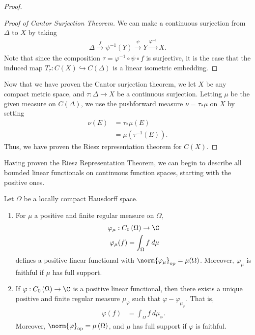 \documentclass[10pt]{mypackage}
\begin{document}
\begin{proof}
\begin{proof}[Proof of Cantor Surjection Theorem]
    We can make a continuous surjection from $\Delta$ to $X$ by taking
    \begin{align*}
      \Delta\xrightarrow{f}\psi^{-1}(Y)\xrightarrow{\psi} Y\xrightarrow{\varphi^{-1}}X.
    \end{align*}
    Note that since the composition $\tau = \varphi^{-1}\circ \psi \circ f$ is surjective, it is the case that the induced map $T_{\tau}: C\left(X\right)\hookrightarrow C\left(\Delta\right)$ is a linear isometric embedding.
  \end{proof}
  Now that we have proven the Cantor surjection theorem, we let $X$ be any compact metric space, and $\tau: \Delta \rightarrow X$ be a continuous surjection. Letting $\mu$ be the given measure on $C(\Delta)$, we use the pushforward measure $\nu = \tau_{\ast}\mu$ on $X$ by setting
  \begin{align*}
    \nu(E) &= \tau_{\ast}\mu\left(E\right)\\
           &= \mu\left(\tau^{-1}\left(E\right)\right).
  \end{align*}
  Thus, we have proven the Riesz representation theorem for $C(X)$.
\end{proof}
Having proven the Riesz Representation Theorem, we can begin to describe all bounded linear functionals on continuous function spaces, starting with the positive ones.
\begin{proposition}
  Let $\Omega$ be a locally compact Hausdorff space.
  \begin{enumerate}[(1)]
    \item For $\mu$ a positive and finite regular measure on $\Omega$,
      \begin{align*}
        \varphi_{\mu}: C_0\left(\Omega\right)\rightarrow \C\\
        \varphi_{\mu}(f) = \int_{\Omega}f\:d\mu
      \end{align*}
      defines a positive linear functional with $\norm{\varphi_{\mu}}_{\text{op}} = \mu\!\left(\Omega\right)$. Moreover, $\varphi_{\mu}$ is faithful if $\mu$ has full support.
    \item If $\varphi: C_0\left(\Omega\right)\rightarrow \C$ is a positive linear functional, then there exists a unique positive and finite regular measure $\mu_{\varphi}$ such that $\varphi - \varphi_{\mu_{\varphi}}$. That is,
      \begin{align*}
        \varphi(f) &= \int_{\Omega}f\:d\mu_{\varphi}.
      \end{align*}
      Moreover, $\norm{\varphi}_{\text{op}} = \mu\left(\Omega\right)$, and $\mu$ has full support if $\varphi$ is faithful.
  \end{enumerate}
\end{proposition}
\end{document}
